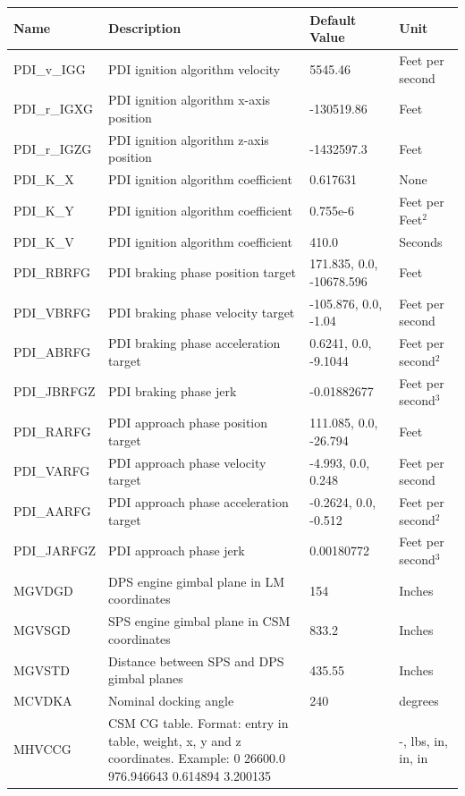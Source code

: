 \documentclass[11pt]{article} %
\begin{document}
\newpage
\begin{tabular}{L{3cm} L{7cm} L{2.5cm} L{1.5cm}}
\hline
\textbf{Name} & \textbf{Description} & \textbf{Default Value} & \textbf{Unit}\\
\hline
PDI\_v\_IGG & PDI ignition algorithm velocity & 5545.46 & Feet per second\\
\hline
PDI\_r\_IGXG & PDI ignition algorithm x-axis position & -130519.86 & Feet\\
\hline
PDI\_r\_IGZG & PDI ignition algorithm z-axis position & -1432597.3 & Feet\\
\hline
PDI\_K\_X & PDI ignition algorithm coefficient & 0.617631 & None\\
\hline
PDI\_K\_Y & PDI ignition algorithm coefficient & 0.755e-6 & Feet per Feet$^2$\\
\hline
PDI\_K\_V & PDI ignition algorithm coefficient & 410.0 & Seconds\\
\hline
PDI\_RBRFG & PDI braking phase position target & 171.835, 0.0, -10678.596 & Feet\\
\hline
PDI\_VBRFG & PDI braking phase velocity target & -105.876, 0.0, -1.04 & Feet per second\\
\hline
PDI\_ABRFG & PDI braking phase acceleration target & 0.6241, 0.0, -9.1044 & Feet per second$^2$\\
\hline
PDI\_JBRFGZ & PDI braking phase jerk & -0.01882677 & Feet per second$^3$\\
\hline
PDI\_RARFG & PDI approach phase position target & 111.085, 0.0, -26.794 & Feet\\
\hline
PDI\_VARFG & PDI approach phase velocity target & -4.993, 0.0, 0.248 & Feet per second\\
\hline
PDI\_AARFG & PDI approach phase acceleration target &  -0.2624, 0.0, -0.512 & Feet per second$^2$\\
\hline
PDI\_JARFGZ & PDI approach phase jerk & 0.00180772 & Feet per second$^3$\\
\hline
MGVDGD&DPS engine gimbal plane in LM coordinates&154&Inches\\
\hline
MGVSGD&SPS engine gimbal plane in CSM coordinates&833.2&Inches\\
\hline
MGVSTD&Distance between SPS and DPS gimbal planes&435.55&Inches\\
\hline
MCVDKA&Nominal docking angle&240&degrees\\
\hline
MHVCCG&CSM CG table. Format: entry in table, weight, x, y and z coordinates. Example: 0 26600.0 976.946643 0.614894 3.200135&&-, lbs, in, in, in\\

\end{tabular}
\end{document}
